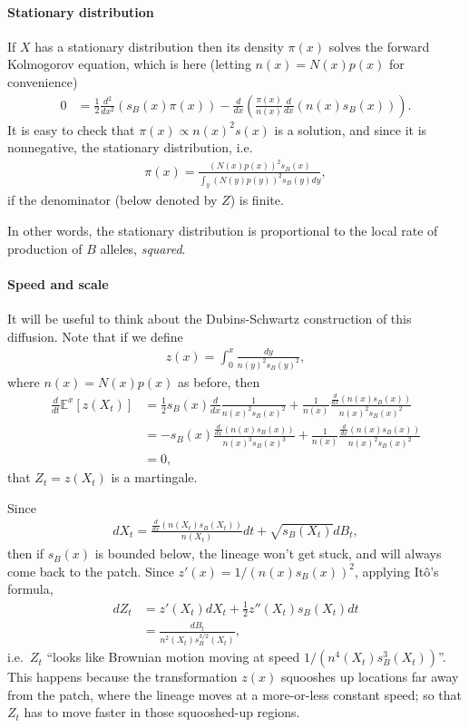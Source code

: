 \documentclass{article}
\newcommand{\E}{\mathbb{E}}
\newcommand{\deriv}[1]{\frac{d}{d#1}}
\newcommand{\dderiv}[1]{\frac{d^2}{d#1^2}}
\begin{document}
\paragraph{Stationary distribution}
If $X$ has a stationary distribution then its density $\pi(x)$ solves the forward Kolmogorov equation,
which is here (letting $n(x) = N(x) p(x)$ for convenience)
\begin{align}
  0 &= \frac{1}{2} \dderiv{x} \left( s_B(x) \pi(x) \right) - \deriv{x} \left( \frac{\pi(x)}{n(x)} \deriv{x}(n(x) s_B(x)) \right) .
\end{align}
It is easy to check that $\pi(x) \propto n(x)^2 s(x) $ is a solution,
and since it is nonnegative, the stationary distribution,
i.e.
\begin{align}
  \pi(x) = \frac{ \left( N(x) p(x) \right)^2 s_B(x) }{ \int_y \left( N(y) p(y) \right)^2 s_B(y) dy } ,
\end{align}
if the denominator (below denoted by $Z$) is finite.

In other words, the stationary distribution is proportional to the local rate of production of $B$ alleles, \emph{squared}.


\paragraph{Speed and scale}
It will be useful to think about the Dubins-Schwartz construction of this diffusion.
Note that if we define
\begin{align}
  z(x) = \int_{0}^x \frac{ dy }{ n(y)^2 s_B(y)^2 },
\end{align}
where $n(x) = N(x) p(x)$ as before,
then
\begin{align}
  \deriv{t} \E^x[z(X_t)] &= \frac{1}{2} s_B(x) \deriv{x} \frac{1}{ n(x)^2 s_B(x)^2 } + \frac{1}{n(x)} \frac{ \deriv{x}(n(x)s_B(x)) }{  n(x)^2 s_B(x)^2 } \\
  &= - s_B(x) \frac{ \deriv{x} (n(x)s_B(x)) }{ n(x)^3 s_B(x)^3 } + \frac{1}{n(x)} \frac{ \deriv{x}(n(x)s_B(x)) }{  n(x)^2 s_B(x)^2 } \\
  &= 0 ,
\end{align}
that $Z_t = z(X_t)$ is a martingale.

Since
\begin{align}
  dX_t = \frac{\deriv{x}(n(X_t)s_B(X_t))}{n(X_t)} dt + \sqrt{s_B(X_t)} dB_t,
\end{align}
then if $s_B(x)$ is bounded below, the lineage won't get stuck,
and will always come back to the patch.
Since $z'(x) = 1/(n(x)s_B(x))^2$,
applying It\^o's formula,
\begin{align}
  dZ_t &=  z'(X_t) dX_t + \frac{1}{2} z''(X_t) s_B(X_t) dt \\
  &= \frac{ dB_t }{ n^2(X_t) s_B^{3/2}(X_t) } ,
\end{align}
i.e.\ $Z_t$ ``looks like Brownian motion moving at speed $1/(n^4(X_t) s_B^3(X_t))$''.
This happens because the transformation $z(x)$ squooshes up locations far away from the patch,
where the lineage moves at a more-or-less constant speed;
so that $Z_t$ has to move faster in those squooshed-up regions.
\end{document}
